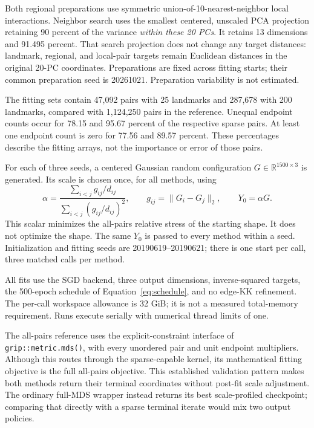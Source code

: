 \documentclass[11pt]{article}
\begin{document}
Both regional preparations use symmetric union-of-10-nearest-neighbor
local interactions. Neighbor search uses the smallest centered, unscaled
PCA projection retaining 90 percent of the variance \emph{within these
20 PCs}. It retains 13 dimensions and 91.495 percent. That search projection
does not change any target distances: landmark, regional, and local-pair
targets remain Euclidean distances in the original 20-PC coordinates.
Preparations are fixed across fitting starts; their common preparation seed
is 20261021. Preparation variability is not estimated.

The fitting sets contain 47,092 pairs with 25 landmarks and 287,678 with
200 landmarks, compared with 1,124,250 pairs in the reference.
Unequal endpoint counts occur for 78.15 and 95.67 percent of the respective
sparse pairs. At least one endpoint count is zero for 77.56 and 89.57 percent.
These percentages describe the fitting arrays, not the importance or error
of those pairs.

For each of three seeds, a centered Gaussian random configuration
$G\in\mathbb R^{1500\times3}$ is generated. Its scale is chosen once, for all
methods, using
\begin{equation}
\alpha=\frac{\sum_{i<j}g_{ij}/d_{ij}}
              {\sum_{i<j}(g_{ij}/d_{ij})^2},\qquad
g_{ij}=\|G_i-G_j\|_2,\qquad Y_0=\alpha G.
\end{equation}
This scalar minimizes the all-pairs relative stress of the starting shape.
It does not optimize the shape. The same $Y_0$ is passed to every method
within a seed. Initialization and fitting seeds are 20190619--20190621;
there is one start per call, three matched calls per method.

All fits use the SGD backend, three output dimensions, inverse-squared
targets, the 500-epoch schedule of Equation~\eqref{eq:schedule}, and no
edge-KK refinement. The per-call workspace allowance is 32 GiB; it is not
a measured total-memory requirement. Runs execute serially with numerical
thread limits of one.

The all-pairs reference uses the explicit-constraint interface of
\texttt{grip::metric.mds()}, with every unordered pair and unit endpoint
multipliers. Although this routes through the sparse-capable kernel, its
mathematical fitting objective is the full all-pairs objective. This
established validation pattern makes both methods return their terminal
coordinates without post-fit scale adjustment. The ordinary full-MDS wrapper
instead returns its best scale-profiled checkpoint; comparing that directly
with a sparse terminal iterate would mix two output policies.
\end{document}
